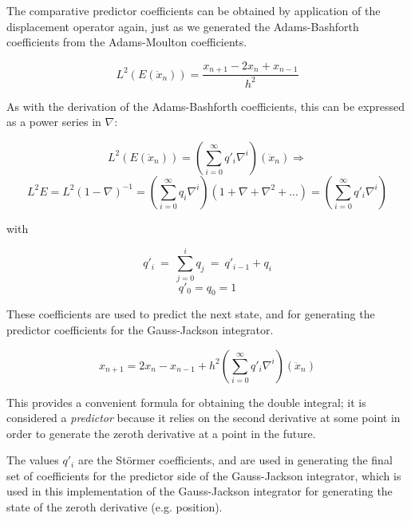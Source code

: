 The comparative predictor coefficients can be obtained by application of
the displacement operator again, just as we generated the
Adams-Bashforth coefficients from the Adams-Moulton coefficients.


\begin{equation*}
L^{2}(E({\ddot{x}}_{n})) = \frac{x_{n+1}-2x_{n}+x_{n-1}}{h^{2}}
\end{equation*}

As with the derivation of the Adams-Bashforth coefficients,
this can be expressed as a power series in $\nabla$:

\begin{equation*}
L^{2}(E({\ddot{x}}_{n})) = \left(\sum _{i=0}^{\infty}q'_{i}\nabla ^{i}\right)
\left({\ddot{x}}_{n}\right) \Rightarrow
\end{equation*}
\begin{equation*}
L^{2}E=L^{2}(1-\nabla )^{-1}=
\left(\sum_{i=0}^{\infty }q_{i}\nabla ^{i}\right)(1+\nabla +\nabla ^{2}+...) =
\left(\sum _{i=0}^{\infty}q'_{i}\nabla ^{i}\right)
\end{equation*}

with

\begin{equation}\label{eq:stormer_qprime_def}
q'_{i}\ =\ \sum _{j=0}^{i}q_{j}\ =\ q'_{i-1}+q_{i}
\end{equation}
\begin{equation*}
q'_{0}=q_{0}=1
\end{equation*}

These coefficients are used to predict the next state, and for
generating the predictor coefficients for the Gauss-Jackson integrator.


\begin{equation} \label{eq:stormer}
x_{n+1}=2x_{n}-x_{n-1}+h^{2}(\sum _{i=0}^{\infty}q'_{i}\nabla ^{i})
\left({\ddot{x}}_{n}\right)
\end{equation}

This provides a convenient formula for obtaining the double integral; it
is considered a \textit{predictor} because it relies on the second derivative
at some point in order to generate the zeroth derivative at a point in the future.

The values $q'_i$ are the St\"ormer coefficients, and are used in
generating the final set of coefficients for the predictor side of the
Gauss-Jackson integrator, which is used in this implementation of the Gauss-Jackson
integrator for generating the state of the zeroth derivative (e.g. position).

